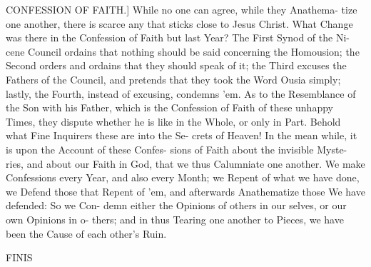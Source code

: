 CONFESSION OF FAITH.] While no
one can agree, while they Anathema-
tize one another, there is scarce any that
sticks close to Jesus Christ. What Change
was there in the Confession of Faith but
last Year? The First Synod of the Ni-
cene Council ordains that nothing should
be said concerning the Homousion; the
Second orders and ordains that they
should speak of it; the Third excuses
the Fathers of the Council, and pretends
that they took the Word Ousia simply;
lastly, the Fourth, instead of excusing,
condemns 'em. As to the Resemblance
of the Son with his Father, which is the
Confession of Faith of these unhappy
Times, they dispute whether he is like
in the Whole, or only in Part. Behold
what Fine Inquirers these are into the Se-
crets of Heaven! In the mean while,
it is upon the Account of these Confes-
sions of Faith about the invisible Myste-
ries, and about our Faith in God, that
we thus Calumniate one another. We
make Confessions every Year, and also
every Month; we Repent of what we
have done, we Defend those that Repent
of 'em, and afterwards Anathematize
those We have defended: So we Con-
demn either the Opinions of others in
our selves, or our own Opinions in o-
thers; and in thus Tearing one another
to Pieces, we have been the Cause of
each other's Ruin.

FINIS
